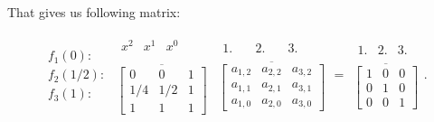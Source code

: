 \documentclass[10pt,b5paper,titlepage]{book}
\begin{document}
That gives us following matrix:

\begin{equation}
    \begin{array}{r}
        \\
        f_{1}(0): \\
        f_{2}(1 / 2): \\
        f_{3}(1): \\
    \end{array}
    \begin{array}{c}
        \begin{matrix}
            x^{2} & x^{1} & x^{0}\\
        \end{matrix}\\
        \overline{
        \begin{bmatrix}
            0 & 0 & 1 \\
            1 / 4 & 1 / 2 & 1 \\
            1 & 1 & 1
        \end{bmatrix}}
    \end{array}
    \begin{array}{c}
        \begin{matrix}
            1. \quad & 2. \quad & 3.
        \end{matrix} \\
        \overline{
        \begin{bmatrix}
            a_{1,2} & a_{2,2} & a_{3,2} \\
            a_{1,1} & a_{2,1} & a_{3,1} \\
            a_{1,0} & a_{2,0} & a_{3,0}
        \end{bmatrix}
        }
    \end{array}
    =
    \begin{array}{c}
        \begin{matrix}
            1. & 2. & 3.
        \end{matrix} \\
        \overline{
        \begin{bmatrix}
            1 & 0 & 0 \\
            0 & 1 & 0 \\
            0 & 0 & 1
        \end{bmatrix}
        }
    \end{array}
.\end{equation}
\end{document}

